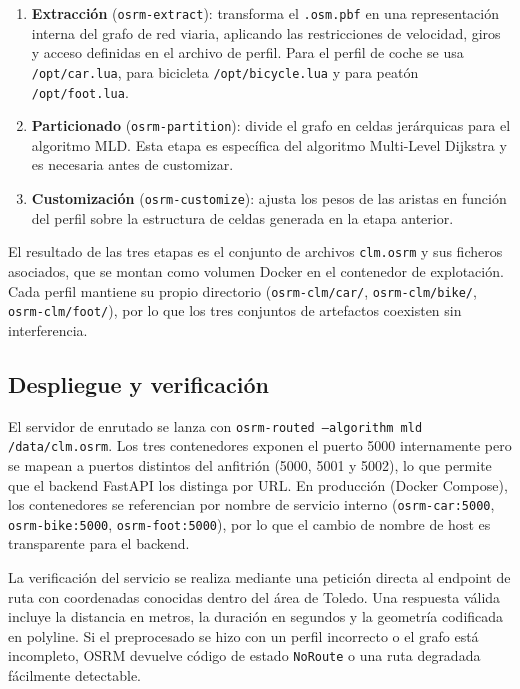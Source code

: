 \begin{enumerate}
  \item \textbf{Extracción} (\texttt{osrm-extract}): transforma el \texttt{.osm.pbf} en una representación interna del grafo de red viaria, aplicando las restricciones de velocidad, giros y acceso definidas en el archivo de perfil. Para el perfil de coche se usa \texttt{/opt/car.lua}, para bicicleta \texttt{/opt/bicycle.lua} y para peatón \texttt{/opt/foot.lua}.
  \item \textbf{Particionado} (\texttt{osrm-partition}): divide el grafo en celdas jerárquicas para el algoritmo MLD. Esta etapa es específica del algoritmo Multi-Level Dijkstra y es necesaria antes de customizar.
  \item \textbf{Customización} (\texttt{osrm-customize}): ajusta los pesos de las aristas en función del perfil sobre la estructura de celdas generada en la etapa anterior.
\end{enumerate}

El resultado de las tres etapas es el conjunto de archivos \texttt{clm.osrm} y sus ficheros asociados, que se montan como volumen Docker en el contenedor de explotación. Cada perfil mantiene su propio directorio (\texttt{osrm-clm/car/}, \texttt{osrm-clm/bike/}, \texttt{osrm-clm/foot/}), por lo que los tres conjuntos de artefactos coexisten sin interferencia.

\subsection{Despliegue y verificación}

El servidor de enrutado se lanza con \texttt{osrm-routed --algorithm mld /data/clm.osrm}. Los tres contenedores exponen el puerto 5000 internamente pero se mapean a puertos distintos del anfitrión (5000, 5001 y 5002), lo que permite que el backend FastAPI los distinga por URL. En producción (Docker Compose), los contenedores se referencian por nombre de servicio interno (\texttt{osrm-car:5000}, \texttt{osrm-bike:5000}, \texttt{osrm-foot:5000}), por lo que el cambio de nombre de host es transparente para el backend.

La verificación del servicio se realiza mediante una petición directa al endpoint de ruta con coordenadas conocidas dentro del área de Toledo. Una respuesta válida incluye la distancia en metros, la duración en segundos y la geometría codificada en polyline. Si el preprocesado se hizo con un perfil incorrecto o el grafo está incompleto, OSRM devuelve código de estado \texttt{NoRoute} o una ruta degradada fácilmente detectable.


